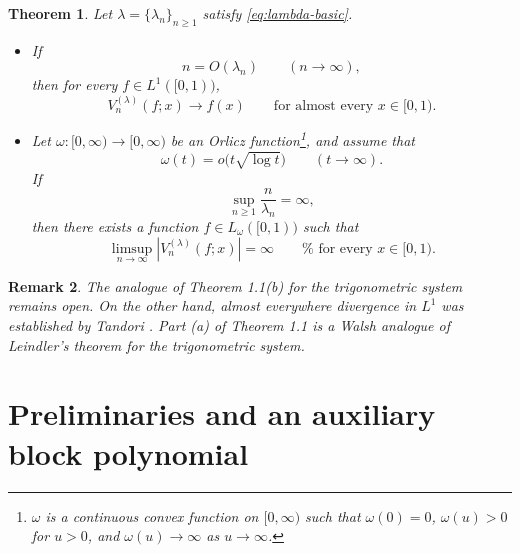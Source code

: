 \documentclass[11pt]{amsart}
\numberwithin{equation}{section}
\theoremstyle{plain}
\newtheorem{theorem}{Theorem}[section]
\newtheorem{remark}[theorem]{Remark}
\begin{document}
\begin{theorem}
\label{thm:main} Let $\lambda=\{\lambda_n\}_{n\ge1}$ satisfy %
\eqref{eq:lambda-basic}.

\begin{itemize}
\item[(a)] If 
\begin{equation}  \label{eq:LT-good}
n=O(\lambda_n) \qquad (n\to\infty),
\end{equation}
then for every $f\in L^{1}([0,1))$, 
\begin{equation*}
V_n^{(\lambda)}(f;x)\longrightarrow f(x) \qquad \text{for almost every }%
x\in[0,1).
\end{equation*}

\item[(b)] Let $\omega :[0,\infty )\rightarrow \lbrack 0,\infty )$ be an
Orlicz function\footnote{$\omega $ is a continuous convex function on $%
[0,\infty )$ such that $\omega (0)=0$, $\omega (u)>0$ for $u>0$, and $\omega
(u)\rightarrow \infty $ as $u\rightarrow \infty $.}, and assume that 
\begin{equation}
\omega (t)=o\bigl(t\sqrt{\log t}\bigr)\qquad (t\rightarrow \infty ).
\label{eq:orlicz-subcritical}
\end{equation}%
If 
\begin{equation}
\sup_{n\geq 1}\frac{n}{\lambda _{n}}=\infty ,  \label{eq:LT-bad}
\end{equation}%
then there exists a function $f\in L_{\omega }([0,1))$ such that 
\begin{equation}
\limsup_{n\rightarrow \infty }|V_{n}^{(\lambda )}(f;x)|=\infty \qquad \text{%
for every }x\in \lbrack 0,1).  \label{eq:main-div}
\end{equation}
\end{itemize}
\end{theorem}

\begin{remark}
	 The analogue of Theorem 1.1(b) for the trigonometric system remains open. On the other hand, almost everywhere divergence in $L^1$ was established by Tandori \cite{Tandori-VP}. Part (a) of Theorem 1.1 is a Walsh analogue of Leindler's theorem \cite{Leindler} for the trigonometric system.
	\end{remark}


\section{Preliminaries and an auxiliary block polynomial}
\end{document}
